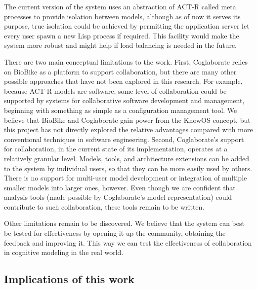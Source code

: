 
The current version of the system uses an abstraction of ACT-R called
meta processes to provide isolation between models, although as of now
it serves its purpose, true isolation could be achieved by permitting
the application server let every user spawn a new Lisp process if
required. This facility would make the system more robust and might
help if load balancing is needed in the future.

There are two main conceptual limitations to the work.
%
First, Coglaborate relies on BioBike as a platform to support
collaboration, but there are many other possible approaches that have
not been explored in this research.  For example, because ACT-R models
are software, some level of collaboration could be supported by
systems for collaborative software development and management,
beginning with something as simple as a configuration management tool.
We believe that BioBike and Coglaborate gain power from the KnowOS
concept, but this project has not directly explored the relative
advantages compared with more conventional techniques in software
engineering.
%
Second, Coglaborate's support for collaboration, in the current state
of its implementation, operates at a relatively granular level.
Models, tools, and architecture extensions can be added to the system
by individual users, so that they can be more easily used by others.
There is no support for multi-user model development or integration of
multiple smaller models into larger ones, however.  Even though we are
confident that analysis tools (made possible by Coglaborate's model
representation) could contribute to such collaboration, these tools
remain to be written.

Other limitations remain to be discovered.  We believe that the system
can best be tested for effectiveness by opening it up the community,
obtaining the feedback and improving it. This way we can test the
effectiveness of collaboration in cognitive modeling in the real
world.

\subsection{Implications of this work}

